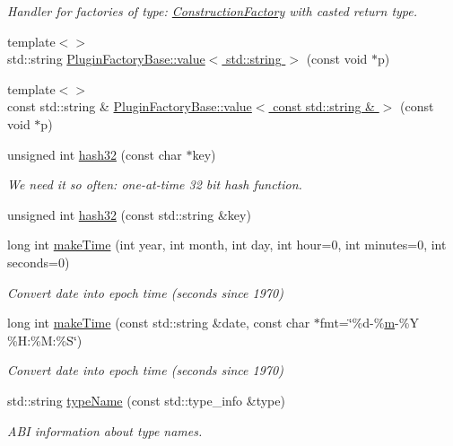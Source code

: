 \begin{DoxyCompactItemize}
\begin{DoxyCompactList}\small\item\em Handler for factories of type\+: \hyperlink{class_d_d4hep_1_1_construction_factory}{Construction\+Factory} with casted return type. \end{DoxyCompactList}\item 
{\footnotesize template$<$$>$ }\\std\+::string \hyperlink{namespace_d_d4hep_ae6577ad7f48957537cd87301f06b226e}{Plugin\+Factory\+Base\+::value$<$ std\+::string $>$} (const void $\ast$p)
\item 
{\footnotesize template$<$$>$ }\\const std\+::string \& \hyperlink{namespace_d_d4hep_a1aa2a293bfef3d7c718ab8b747181709}{Plugin\+Factory\+Base\+::value$<$ const std\+::string \& $>$} (const void $\ast$p)
\item 
unsigned int \hyperlink{namespace_d_d4hep_a64c38e1f6b17efb9177457a3f2690daa}{hash32} (const char $\ast$key)
\begin{DoxyCompactList}\small\item\em We need it so often\+: one-\/at-\/time 32 bit hash function. \end{DoxyCompactList}\item 
unsigned int \hyperlink{namespace_d_d4hep_a856fab7f400a9e8c0e3f999f933d3883}{hash32} (const std\+::string \&key)
\item 
long int \hyperlink{namespace_d_d4hep_ae99d8100ffc43cc104f89aae55187f11}{make\+Time} (int year, int month, int day, int hour=0, int minutes=0, int seconds=0)
\begin{DoxyCompactList}\small\item\em Convert date into epoch time (seconds since 1970) \end{DoxyCompactList}\item 
long int \hyperlink{namespace_d_d4hep_adf6475d1fb2f6f99ec94fd7bbcae5e49}{make\+Time} (const std\+::string \&date, const char $\ast$fmt=\char`\"{}\%d-\/\%\hyperlink{_volumes_8cpp_a6fc379aaec47ce424b00d8ffda2a6c59}{m}-\/\%Y \%H\+:\%M\+:\%S\char`\"{})
\begin{DoxyCompactList}\small\item\em Convert date into epoch time (seconds since 1970) \end{DoxyCompactList}\item 
std\+::string \hyperlink{namespace_d_d4hep_aac3aec612736d0521670ca2e7b1305bd}{type\+Name} (const std\+::type\+\_\+info \&type)
\begin{DoxyCompactList}\small\item\em A\+BI information about type names. \end{DoxyCompactList}\item 

\end{DoxyCompactItemize}
